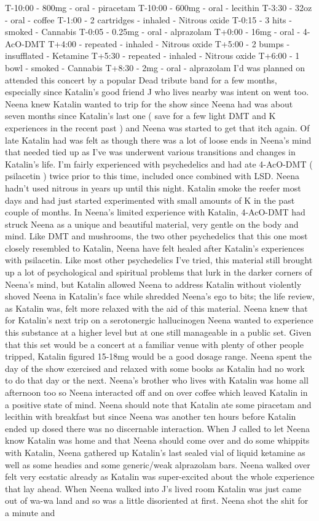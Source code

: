 \documentclass[12pt]{book}
\begin{document}
T-10:00 - 800mg - oral - piracetam T-10:00 - 600mg - oral - lecithin T-3:30 - 32oz - oral - coffee T-1:00 - 2 cartridges - inhaled - Nitrous oxide T-0:15 - 3 hits - smoked - Cannabis T-0:05 - 0.25mg - oral - alprazolam T+0:00 - 16mg - oral - 4-AcO-DMT T+4:00 - repeated - inhaled - Nitrous oxide T+5:00 - 2 bumps - insufflated - Ketamine T+5:30 - repeated - inhaled - Nitrous oxide T+6:00 - 1 bowl - smoked - Cannabis T+8:30 - 2mg - oral - alprazolam I'd was planned on attended this concert by a popular Dead tribute band for a few months, especially since Katalin's good friend J who lives nearby was intent on went too. Neena knew Katalin wanted to trip for the show since Neena had was about seven months since Katalin's last one ( save for a few light DMT and K experiences in the recent past ) and Neena was started to get that itch again. Of late Katalin had was felt as though there was a lot of loose ends in Neena's mind that needed tied up as I've was underwent various transitions and changes in Katalin's life. I'm fairly experienced with psychedelics and had ate 4-AcO-DMT ( psilacetin ) twice prior to this time, included once combined with LSD. Neena hadn't used nitrous in years up until this night. Katalin smoke the reefer most days and had just started experimented with small amounts of K in the past couple of months. In Neena's limited experience with Katalin, 4-AcO-DMT had struck Neena as a unique and beautiful material, very gentle on the body and mind. Like DMT and mushrooms, the two other psychedelics that this one most closely resembled to Katalin, Neena have felt healed after Katalin's experiences with psilacetin. Like most other psychedelics I've tried, this material still brought up a lot of psychological and spiritual problems that lurk in the darker corners of Neena's mind, but Katalin allowed Neena to address Katalin without violently shoved Neena in Katalin's face while shredded Neena's ego to bits; the life review, as Katalin was, felt more relaxed with the aid of this material. Neena knew that for Katalin's next trip on a serotonergic hallucinogen Neena wanted to experience this substance at a higher level but at one still manageable in a public set. Given that this set would be a concert at a familiar venue with plenty of other people tripped, Katalin figured 15-18mg would be a good dosage range. Neena spent the day of the show exercised and relaxed with some books as Katalin had no work to do that day or the next. Neena's brother who lives with Katalin was home all afternoon too so Neena interacted off and on over coffee which leaved Katalin in a positive state of mind. Neena should note that Katalin ate some piracetam and lecithin with breakfast but since Neena was another ten hours before Katalin ended up dosed there was no discernable interaction. When J called to let Neena know Katalin was home and that Neena should come over and do some whippits with Katalin, Neena gathered up Katalin's last sealed vial of liquid ketamine as well as some headies and some generic/weak alprazolam bars. Neena walked over felt very ecstatic already as Katalin was super-excited about the whole experience that lay ahead. When Neena walked into J's lived room Katalin was just came out of wa-wa land and so was a little disoriented at first. Neena shot the shit for a minute and 
\end{document}
